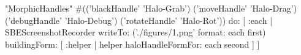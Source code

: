 \newcommand{\figlabel}[1]{\label{fig:#1}}
\newcommand{\seclabel}[1]{\label{sec:#1}}
\newcommand{\menu}[1]{{%
	\setlength{\fboxsep}{0pt}%
	\colorbox{lightgray}{{{\upshape\sffamily\strut \,#1\,}}}}}
\newcommand{\link}[1]{{%
	\fontfamily{lmr}\selectfont
 	\upshape{\sffamily \underline{#1}}}}
\newcommand{\go}{\,$\triangleright$\,}
\newcommand{\short}[1]{\mbox{{\sc cmd}\hspace{0.08em}--\hspace{0.09em}#1}\xspace}
\newcommand{\button}[1]{{%
	\setlength{\fboxsep}{0pt}%
	\fbox{{\upshape\sffamily\strut \,#1\,}}}}
\newcommand{\toolsflap}{\textit{Tools} flap\xspace}
\newcommand{\toolsmenu}{\textit{Tools} menu\xspace}
%
\newcommand{\dothisicon}{\raisebox{-.5ex}{\texttt{[image: squeak-logo]}}}
\newcommand{\dothis}[1]{%
	\medskip
	\noindent\dothisicon
	\ifx#1\empty\else\quad\emph{#1}\fi
	\par\smallskip\nopagebreak}
%
\newcommand{\hint}[1]{\vspace{1ex}\noindent\fbox{\textsc{Hint}} \emph{#1}}
\begin{ExecuteSmalltalkScript}
"MorphicHandles"
#(('blackHandle' 'Halo-Grab') ('moveHandle' 'Halo-Drag') ('debugHandle' 'Halo-Debug') ('rotateHandle' 'Halo-Rot'))
	do: [ :each |
		SBEScreenshotRecorder
			writeTo: ('./figures/{1}.png' format: {each first})
			buildingForm: [ :helper |
				helper haloHandleFormFor: each second ] ]
\end{ExecuteSmalltalkScript}
\newcommand{\grabHandle}{\raisebox{-0.2ex}{\texttt{[image: blackHandle]}}}
\newcommand{\moveHandle}{\raisebox{-0.2ex}{\texttt{[image: moveHandle]}}}
